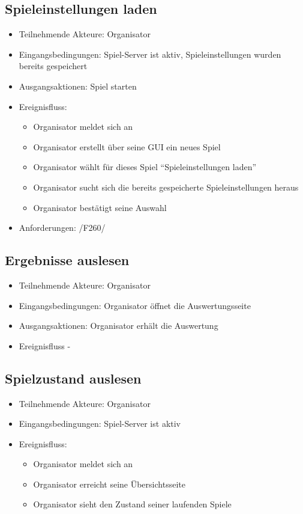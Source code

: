 \documentclass[a4paper]{scrreprt}
\begin{document}
    \subsection{Spieleinstellungen laden}
    \begin{itemize}
        \item Teilnehmende Akteure: \Gls{Organisator}
        \item Eingangsbedingungen: Spiel-Server ist aktiv, \Gls{Spieleinstellungen} wurden bereits gespeichert
        \item Ausgangsaktionen: Spiel starten
        \item Ereignisfluss:
        \begin{itemize}
            \item \Gls{Organisator} meldet sich an
            \item \Gls{Organisator} erstellt über seine GUI ein neues Spiel
            \item \Gls{Organisator} wählt für dieses Spiel \enquote{Spieleinstellungen laden}
            \item \Gls{Organisator} sucht sich die bereits gespeicherte \Gls{Spieleinstellungen} heraus
            \item \Gls{Organisator} bestätigt seine Auswahl
        \end{itemize}
        \item Anforderungen: /F260/
    \end{itemize}

    \subsection{Ergebnisse auslesen}

    \begin{itemize}
        \item Teilnehmende Akteure: \Gls{Organisator}
        \item Eingangsbedingungen: \Gls{Organisator} öffnet die Auswertungsseite
        \item Ausgangsaktionen: \Gls{Organisator} erhält die Auswertung
        \item Ereignisfluss -
    \end{itemize}
 \subsection{Spielzustand auslesen}
	\begin{itemize}
		\item Teilnehmende Akteure: \Gls{Organisator}
		\item Eingangsbedingungen: Spiel-Server ist aktiv
		\item Ereignisfluss:
		\begin{itemize}
			\item \Gls{Organisator} meldet sich an
			\item \Gls{Organisator} erreicht seine Übersichtsseite
			\item \Gls{Organisator} sieht den Zustand seiner laufenden Spiele
		\end{itemize}
	\end{itemize}
\end{document}
